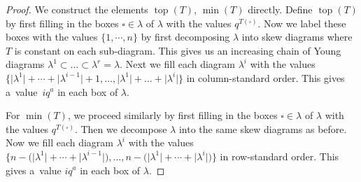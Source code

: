 \documentclass[pdftex]{sigma}
\numberwithin{equation}{section}
\theoremstyle{definition}
\DeclareMathOperator{\Top}{\mathrm{top}}
\DeclareMathOperator{\Min}{\mathrm{min}}
\begin{document}
\begin{proof}
 We construct the elements $\Top(T)$, $\Min(T)$ directly. Define $\Top(T)$ by first filling in the boxes $\square \in \lambda$ of $\lambda$ with the values $q^{T(\square)}$. Now we label these boxes with the values $\{1,\cdots, n \}$ by first decomposing $\lambda$ into skew diagrams where $T$ is constant on each sub-diagram. This gives us an increasing chain of Young diagrams $\lambda^{1}\subset \dots \subset \lambda^{r} = \lambda$. Next we fill each diagram $\lambda^{i}$ with the values $\big\{\big|\lambda^{1}\big|+\cdots + \big|\lambda^{i-1}\big|+1,\dots, \big|\lambda^{1}\big|+\dots + \big|\lambda^{i}\big| \big\} $ in column-standard order. This gives a~value~$iq^a$ in each box of $\lambda$.

 For $\Min(T)$, we proceed similarly by first filling in the boxes $\square \in \lambda$ of $\lambda$ with the values $q^{T(\square)}$. Then we decompose $\lambda$ into the same skew diagrams as before. Now we fill each diagram $\lambda^{i}$ with the values $\big\{n-\bigl(\big|\lambda^{1}\big|+\cdots + \big|\lambda^{i-1}\big|\bigr),\dots, n-\bigl(\big|\lambda^{1}\big|+\cdots + \big|\lambda^{i}\big|\bigr) \big\} $ in row-standard order. This gives a~value $iq^a$ in each box of $\lambda$.
\end{proof}
\end{document}
